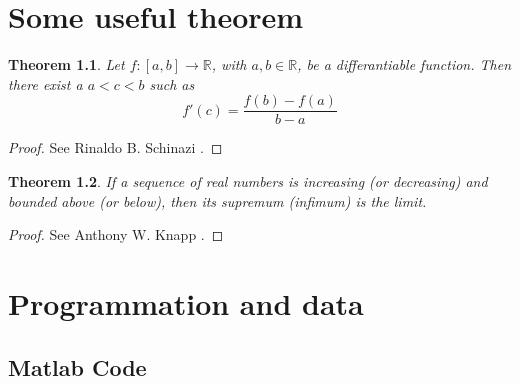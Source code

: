 \documentclass[12pt,travaildirige,nobabel, twoside]{dms}
\numberwithin{equation}{section}
\numberwithin{table}{chapter}
\numberwithin{figure}{chapter}
\newtheorem{theorem}{Theorem}[section]
\begin{document}
%
%


\appendix
\chapter{Some useful theorem}

\begin{theorem}\label{thm:point milieu}
Let $f:[a,b]\rightarrow\mathbb{R}$, with $a,b\in\mathbb{R}$, be a differantiable function. Then there exist a $a<c<b$ such as \begin{equation}
f'(c)=\frac{f(b)-f(a)}{b-a}
\end{equation}
\end{theorem}
\begin{proof}
See Rinaldo B. Schinazi \citep{analysis}.
\end{proof}

\begin{theorem} \label{thm:monotone}
If a sequence of real numbers is increasing (or decreasing) and bounded above (or below), then its supremum (infimum) is the limit.
\end{theorem}

\begin{proof}
See Anthony W. Knapp \citep{monotone}.
\end{proof}




\chapter{Programmation and data}

\section{Matlab Code}
\end{document}
